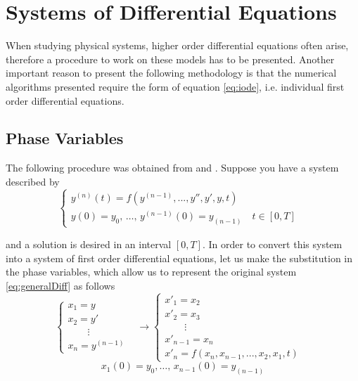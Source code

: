 \section{Systems of Differential Equations}
When studying physical systems, higher order differential equations often arise, therefore a procedure to work on these models has to be presented. Another important reason to present the following methodology is that the numerical algorithms presented require the form of equation \eqref{eq:iode}, i.e. individual first order differential equations.

\subsection{Phase Variables}
The following procedure was obtained from \cite{rowell2002state} and \cite{antsaklis2006linear}. Suppose you have a system described by
\begin{equation}\label{eq:generalDiff}
\begin{cases}
    y^{(n)}(t)=f\left(y^{(n-1)},...,y'',y',y,t\right) &\\ y(0)=y_0,\,\dots,\,y^{(n - 1)}(0)= y_{(n - 1)}\quad t\in[0,T]&
\end{cases}
\end{equation}

and a solution is desired in an interval $[0,T]$. In order to convert this system into a system of first order differential equations, let us make the substitution in the phase variables, which allow us to represent the original system \eqref{eq:generalDiff} as follows
\begin{equation}
    \begin{cases}
        x_1 = y&\\
        x_2 = y'&\\
        \qquad\vdots&\\
        x_n = y^{(n-1)}&
    \end{cases}\longrightarrow
     \begin{cases}
        x'_1=x_2&\\
        x'_2=x_3&\\
        \qquad\vdots&\\
        x'_{n-1}=x_n&\\
        x'_n=f\left(x_n,x_{n-1},...,x_2,x_1,t\right)
    \end{cases}
\end{equation}
\begin{equation*}
    x_1(0)=y_0,\dots,\,x_{n - 1}(0)= y_{(n - 1)}
\end{equation*}

